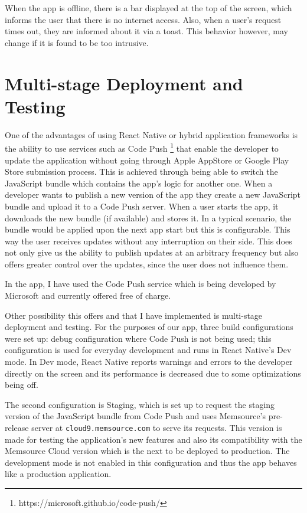 When the app is offline, there is a bar displayed at the top of the screen, which informs the user that there is no internet access. Also, when a user's request times out, they are informed about it via a toast. This behavior however, may change if it is found to be too intrusive.


\section{Multi-stage Deployment and Testing}


One of the advantages of using React Native or hybrid application frameworks is the ability to use services such as Code Push \footnote{https://microsoft.github.io/code-push/} that enable the developer to update the application without going through Apple AppStore or Google Play Store submission process. This is achieved through being able to switch the JavaScript bundle which contains the app’s logic for another one. When a developer wants to publish a new version of the app they create a new JavaScript bundle and upload it to a Code Push server. 
When a user starts the app, it downloads the new bundle (if available) and stores it. In a typical scenario, the bundle would be applied upon the next app start but this is configurable. This way the user receives updates without any interruption on their side. This does not only give us the ability to publish updates at an arbitrary frequency but also offers greater control over the updates, since the user does not influence them.


In the app, I have used the Code Push service which is being developed by Microsoft and currently offered free of charge. 


Other possibility this offers and that I have implemented is multi-stage deployment and testing. For the purposes of our app, three build configurations were set up: debug configuration where Code Push is not being used; this configuration is used for everyday development and runs in React Native’s Dev mode. In Dev mode, React Native reports warnings and errors to the developer directly on the screen and its performance is decreased due to some optimizations being off.

The second configuration is Staging, which is set up to request the staging version of the JavaScript bundle from Code Push and uses Memsource’s pre-release server at \texttt{cloud9.memsource.com} to serve its requests. This version is made for testing the application's new features and also its compatibility with the Memsource Cloud version which is the next to be deployed to production. The development mode is not enabled in this configuration and thus the app behaves like a production application. 


